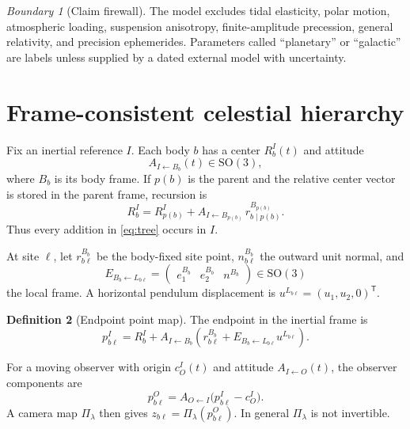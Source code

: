 \documentclass[11pt,a4paper]{article}
\theoremstyle{definition}
\newtheorem{definition}{Definition}[section]
\theoremstyle{plain}
\theoremstyle{remark}
\newtheorem{warning}[definition]{Boundary}
\newcommand{\SO}{\mathrm{SO}}
\begin{document}
\begin{warning}[Claim firewall]
The model excludes tidal elasticity, polar motion, atmospheric
loading, suspension anisotropy, finite-amplitude precession, general
relativity, and precision ephemerides. Parameters called ``planetary''
or ``galactic'' are labels unless supplied by a dated external model
with uncertainty.
\end{warning}

\section{Frame-consistent celestial hierarchy}

Fix an inertial reference \(I\). Each body \(b\) has a center
\(R_b^I(t)\) and attitude
\[
A_{I\leftarrow B_b}(t)\in\SO(3),
\]
where \(B_b\) is its body frame. If \(p(b)\) is the parent and the
relative center vector is stored in the parent frame, recursion is
\begin{equation}\label{eq:tree}
R_b^I
=R_{p(b)}^I
+A_{I\leftarrow B_{p(b)}}\,r_{b\mid p(b)}^{B_{p(b)}}.
\end{equation}
Thus every addition in \cref{eq:tree} occurs in \(I\).

At site \(\ell\), let \(r_{b\ell}^{B_b}\) be the body-fixed site point,
\(n_{b\ell}^{B_b}\) the outward unit normal, and
\[
E_{B_b\leftarrow L_{b\ell}}
=\begin{pmatrix}e_1^{B_b}&e_2^{B_b}&n^{B_b}\end{pmatrix}
\in\SO(3)
\]
the local frame. A horizontal pendulum displacement is
\(u^{L_{b\ell}}=(u_1,u_2,0)^{\mathsf T}\).

\begin{definition}[Endpoint point map]
The endpoint in the inertial frame is
\begin{equation}\label{eq:endpoint-I}
p_{b\ell}^I
=R_b^I+
A_{I\leftarrow B_b}
\left(
r_{b\ell}^{B_b}
+E_{B_b\leftarrow L_{b\ell}}u^{L_{b\ell}}
\right).
\end{equation}
\end{definition}

For a moving observer with origin \(c_O^I(t)\) and attitude
\(A_{I\leftarrow O}(t)\), the observer components are
\begin{equation}\label{eq:observer-frame}
p_{b\ell}^{O}
=A_{O\leftarrow I}
\bigl(p_{b\ell}^I-c_O^I\bigr).
\end{equation}
A camera map \(\Pi_\lambda\) then gives
\(z_{b\ell}=\Pi_\lambda(p_{b\ell}^{O})\). In general
\(\Pi_\lambda\) is not invertible.
\end{document}
